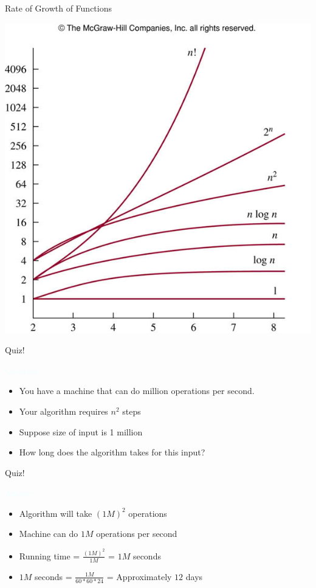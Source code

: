 \documentclass{beamer}
\newcommand{\tblue}[1]{{\Large {\textcolor{azure}{#1}}}}
\begin{document}
\begin{frame}{Rate of Growth of Functions}
\begin{center}
    \includegraphics[scale=0.3]{rateOfGrowth.jpg}
\end{center}
\end{frame}

\begin{frame}{Quiz!}

\tblue{Question:}
\begin{itemize}
\item You have a machine that can do million operations per second.
\item Your algorithm requires $n^2$ steps
\item Suppose size of input is 1 million
\item How long does the algorithm takes for this input?
\end{itemize}
\end{frame}


\begin{frame}{Quiz!}

\tblue{Answer:}
\begin{itemize}
\item Algorithm will take $(1M)^2$ operations
\item Machine can do $1M$ operations per second
\item Running time = $\frac{(1M)^2}{1M}$ = $1M$ seconds
\item $1M$ seconds = $\frac{1M}{60*60*24}$ = Approximately $12$ days
\end{itemize}
\end{frame}
\end{document}
